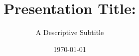 \title{Presentation Title:}
\subtitle{A Descriptive Subtitle}
\newcommand{\PresentationPDFAuthors}{First Author; Second Author}

\newcommand{\PresentationAuthorBlock}{%
  \begin{columns}[T,onlytextwidth]
    \column{0.48\textwidth}
      \centering
      First Author\\[-0.1em]
      {\small\itshape First Affiliation}
    \column{0.48\textwidth}
      \centering
      Second Author\\[-0.1em]
      {\small\itshape Second Affiliation}
  \end{columns}%
}

\date{\today}

\newif\ifshowbibliography
\showbibliographyfalse
